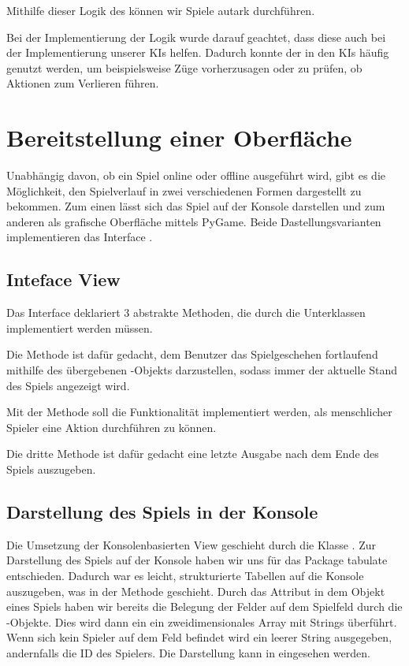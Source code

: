 Mithilfe dieser Logik des  können wir Spiele autark durchführen.

Bei der Implementierung der Logik wurde darauf geachtet, dass diese auch bei der Implementierung unserer \ac{KI}s
helfen.
Dadurch konnte der  in den \ac{KI}s häufig genutzt werden, um beispielsweise Züge vorherzusagen oder
zu prüfen, ob Aktionen zum Verlieren führen.

\section{Bereitstellung einer Oberfläche}
\label{sec:bereitstellung-oberflaeche}

Unabhängig davon, ob ein Spiel online oder offline ausgeführt wird, gibt es die Möglichkeit, den Spielverlauf in zwei
verschiedenen Formen dargestellt zu bekommen.
Zum einen lässt sich das Spiel auf der Konsole darstellen und zum anderen als grafische Oberfläche mittels PyGame.
Beide Dastellungsvarianten implementieren das Interface .

\subsection{Inteface View}
\label{subsec:interface-view}

Das Interface  deklariert 3 abstrakte Methoden, die durch die Unterklassen implementiert werden müssen.

Die Methode  ist dafür gedacht, dem Benutzer das Spielgeschehen fortlaufend mithilfe des
übergebenen -Objekts darzustellen, sodass immer der aktuelle Stand des Spiels angezeigt wird.

Mit der Methode  soll die Funktionalität implementiert werden, als menschlicher Spieler eine
Aktion durchführen zu können.

Die dritte Methode  ist dafür gedacht eine letzte Ausgabe nach dem Ende des Spiels auszugeben.

\subsection{Darstellung des Spiels in der Konsole}
\label{subsec:oberflaeche-konsole}

Die Umsetzung der Konsolenbasierten View geschieht durch die Klasse .
Zur Darstellung des Spiels auf der Konsole haben wir uns für das Package tabulate entschieden.
Dadurch war es leicht, strukturierte Tabellen auf die Konsole auszugeben, was in der Methode 
geschieht.
Durch das Attribut  in dem Objekt eines Spiels haben wir bereits die Belegung der Felder auf dem Spielfeld
durch die -Objekte.
Dies wird dann ein ein zweidimensionales Array mit Strings überführt.
Wenn sich kein Spieler auf dem Feld befindet wird ein leerer String ausgegeben, andernfalls die ID des Spielers.
Die Darstellung kann in  eingesehen werden.\\

